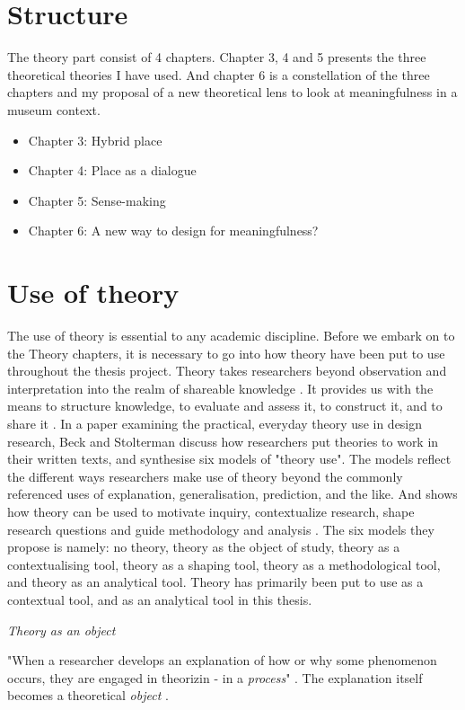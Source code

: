 \section*{Structure}

The theory part consist of 4 chapters. Chapter 3, 4 and 5 presents the three theoretical theories I have used. And chapter 6 is a constellation of the three chapters and my proposal of a new theoretical lens to look at meaningfulness in a museum context.
\begin{itemize}
    \item Chapter 3: Hybrid place
    \item Chapter 4: Place as a dialogue
    \item Chapter 5: Sense-making
    \item Chapter 6: A new way to design for meaningfulness?
\end{itemize}
\par


\section*{Use of theory}
The use of theory is essential to any academic discipline. Before we embark on to the Theory chapters, it is necessary to go into how theory have been put to use throughout the thesis project. Theory takes researchers beyond observation and interpretation into the realm of shareable knowledge \autocite[p. 126]{beck_examining_2016}. It provides us with the means to structure knowledge, to evaluate and assess it, to construct it, and to share it \autocite[p. 126]{beck_examining_2016}. In a paper examining the practical, everyday theory use in design research, Beck and Stolterman discuss how researchers put theories to work in their written texts, and synthesise six models of "theory use". The models reflect the different ways researchers make use of theory beyond the commonly referenced uses of explanation, generalisation, prediction, and the like. And shows how theory can be used to motivate inquiry, contextualize research, shape research questions and guide methodology and analysis \autocite[p. 134]{beck_examining_2016}. The six models they propose is namely: no theory, theory as the object of study, theory as a contextualising tool, theory as a shaping tool, theory as a methodological tool, and theory as an analytical tool. Theory has primarily been put to use as a contextual tool, and as an analytical tool in this thesis.

\par \emph{Theory as an object} \par
"When a researcher develops an explanation of how or why some phenomenon occurs, they are engaged in theorizin - in a \emph{process}" \autocite[p.126]{beck_examining_2016}. The explanation itself becomes a theoretical \emph{object} \autocite[p. 126]{beck_examining_2016}.  



